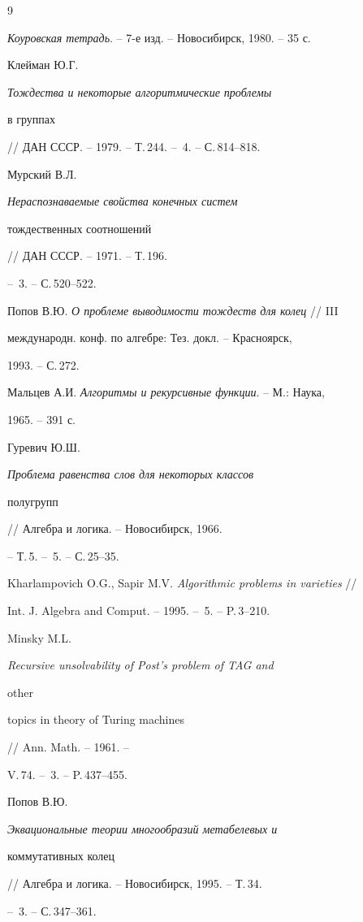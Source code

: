 \begin{thebibliography}{9} 


 




{\em Коуровская тетрадь}. -- 7-е изд. -- Новосибирск, 1980. -- 35 с. 






Клейман Ю.Г. {\em Тождества и некоторые алгоритмические проблемы  


в группах} // ДАН СССР. -- 1979. -- Т.\,244. -- \No\,4. -- С.\,814--818. 




Мурский В.Л. {\em Нераспознаваемые свойства конечных систем  


тождественных соотношений} // ДАН СССР. -- 1971. -- Т.\,196. 


-- \No\,3. -- С.\,520--522. 




Попов В.Ю. {\em О проблеме выводимости тождеств для колец} // III 


международн. конф. по алгебре: Тез. докл. -- Красноярск, 


1993. -- С.\,272. 




Мальцев А.И. {\em Алгоритмы и рекурсивные функции}. -- М.: Наука,  


1965. -- 391 с. 




Гуревич Ю.Ш. {\em Проблема равенства слов для некоторых классов  


полугрупп} // Алгебра и логика. -- Новосибирск, 1966. 


-- Т.\,5. -- \No\,5. -- С.\,25--35. 




Kharlampovich O.G., Sapir M.V. {\em Algorithmic problems in varieties} //  


Int. J. Algebra and Comput. -- 1995. -- \No\,5. -- P.\,3--210. 




Minsky M.L. {\em Recursive unsolvability of Post's problem of TAG and 


other 


topics in theory of Turing machines} // Ann. Math. -- 1961. -- 


V.\,74. -- \No\,3. -- P.\,437--455. 




Попов В.Ю. {\em Эквациональные теории многообразий метабелевых и  


коммутативных колец} // Алгебра и логика. -- Новосибирск, 1995. -- Т.\,34. 


-- \No\,3. -- С.\,347--361. 


 


\end{thebibliography} 


